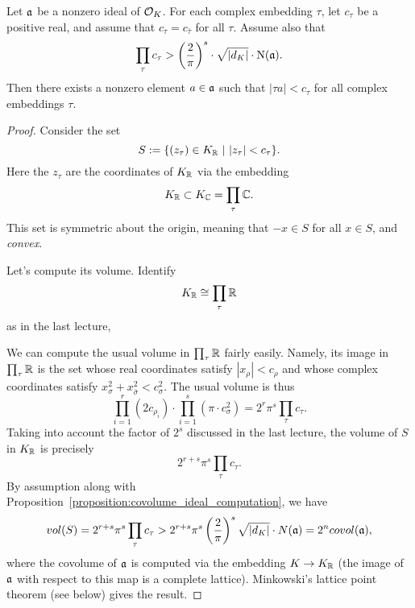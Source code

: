 \begin{theorem}\label{theorem:exists_norm_mult}
  Let $\mathfrak{a}$ be a nonzero ideal of $\mathcal{O}_{K}$.
  For each complex embedding $\tau$, let $c_{\tau}$ be a positive real, and assume that $c_{\tau} = c_{\bar\tau}$ for all $\tau$.
  Assume also that
  \[ \prod_{\tau} c_{\tau} > \left(\frac{2}{\pi}\right)^{s} \cdot \sqrt{|d_{K}|} \cdot \operatorname{N}(\mathfrak{a}). \]
  Then there exists a nonzero element $a \in \mathfrak{a}$ such that $|\tau a|<c_{\tau}$ for all complex embeddings $\tau$.
\end{theorem}
\begin{proof}
  Consider the set
  \[ S := \{(z_{\tau}) \in K_{\mathbb{R}} \ | \ |z_{\tau}| < c_{\tau} \}. \]
  Here the $z_{\tau}$ are the coordinates of $K_{\mathbb{R}}$ via the embedding
  \[ K_{\mathbb{R}} \subset K_{\mathbb{C}} = \prod_{\tau} \mathbb{C}. \]
  This set is symmetric about the origin, meaning that $-x \in S$ for all $x \in S$, and \emph{convex}.

  Let's compute its volume.
  Identify
  \[ K_{\mathbb{R}} \cong \prod_{\tau} \mathbb{R} \]
  as in the last lecture, 

  We can compute the usual volume in $\prod_{\tau}\mathbb{R}$ fairly easily.
  Namely, its image in $\prod_{\tau} \mathbb{R}$ is the set whose real coordinates satisfy $|x_{\rho}| < c_{\rho}$ and whose complex coordinates satisfy $x_{\sigma}^{2} + x_{\bar\sigma}^{2} < c_{\sigma}^{2}$.
  The usual volume is thus
  \[ \prod_{i = 1}^{r} (2 c_{\rho_{i}}) \cdot \prod_{i = 1}^{s} (\pi \cdot c_{\sigma}^{2}) = 2^{r} \pi^{s} \prod_{\tau} c_{\tau}. \]
  Taking into account the factor of $2^{s}$ discussed in the last lecture, the volume of $S$ in $K_{\mathbb{R}}$ is precisely
  \[ 2^{r+s} \pi^{s} \prod_{\tau} c_{\tau}. \]
  By assumption along with Proposition~\ref{proposition:covolume_ideal_computation}, we have
  \[ vol(S) = 2^{r+s} \pi^{s} \prod_{\tau} c_{\tau} > 2^{r+s} \pi^{s} \left( \frac{2}{\pi} \right)^{s} \sqrt{|d_{K}|} \cdot N(\mathfrak{a}) = 2^{n} covol(\mathfrak{a}), \]
  where the covolume of $\mathfrak{a}$ is computed via the embedding $K \to K_{\mathbb{R}}$ (the image of $\mathfrak{a}$ with respect to this map is a complete lattice).
  Minkowski's lattice point theorem (see below) gives the result.
\end{proof}

